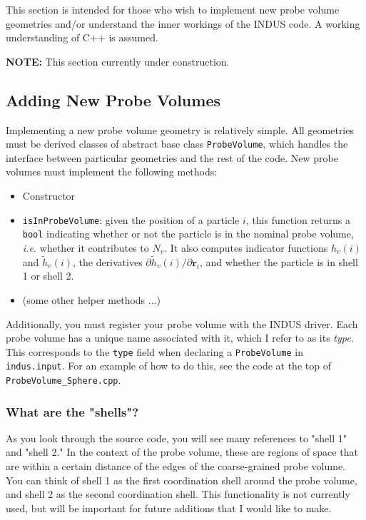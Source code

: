 \documentclass[11pt,notitlepage]{article}
\begin{document}
This section is intended for those who wish to implement new probe volume geometries and/or understand the inner workings of the INDUS code. A working understanding of C++ is assumed. 

\textbf{NOTE:} This section currently under construction.


\subsection{Adding New Probe Volumes}

Implementing a new probe volume geometry is relatively simple. All geometries must be derived classes of abstract base class \texttt{ProbeVolume}, which handles the interface between particular geometries and the rest of the code. New probe volumes must implement the following methods:

\begin{itemize}
	\item Constructor
	\item \texttt{isInProbeVolume}: given the position of a particle $i$, this function returns a \texttt{bool} indicating whether or not the particle is in the nominal probe volume, \emph{i.e.} whether it contributes to $N_v$. It also computes indicator functions $h_v(i)$ and $\tilde{h}_v(i)$, the derivatives $\partial \tilde{h}_v(i) / \partial \mathbf{r}_i$, and whether the particle is in shell 1 or shell 2.
	\item (some other helper methods ...)
\end{itemize}

Additionally, you must register your probe volume with the INDUS driver. Each probe volume has a unique name associated with it, which I refer to as its \emph{type}. This corresponds to the \texttt{type} field when declaring a \texttt{ProbeVolume} in \texttt{indus.input}. For an example of how to do this, see the code at the top of \texttt{ProbeVolume\_Sphere.cpp}.


\subsubsection{What are the "shells"?}

As you look through the source code, you will see many references to "shell 1" and "shell 2." In the context of the probe volume, these are regions of space that are within a certain distance of the edges of the coarse-grained probe volume. You can think of shell 1 as the first coordination shell around the probe volume, and shell 2 as the second coordination shell. This functionality is not currently used, but will be important for future additions that I would like to make.
\end{document}
